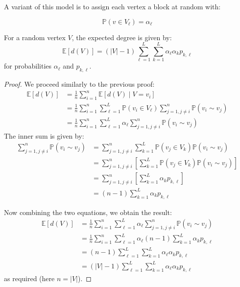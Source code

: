 \documentclass{article}
\begin{document}
A variant of this model is to assign each vertex a block at random with:    

\begin{equation*}
    \mathbb{P}(v\in V_{\ell}) = \alpha_{\ell}
\end{equation*}  

\begin{proposition}
    For a random vertex $V$, the expected degree is given by:
    \begin{equation*}
        \mathbb{E}[d(V)] = (|V|-1)\sum_{\ell=1}^{L}\sum_{k=1}^{L}\alpha_{\ell}\alpha_{k}p_{k,\ell}
    \end{equation*}
    for probabilities $\alpha_{\ell}$ and $p_{k,\ell}$.
\end{proposition}

\begin{proof}
    We proceed similarly to the previous proof:
    \begin{align*}
        \mathbb{E}[d(V)] &= \frac{1}{n} \sum_{i=1}^n \mathbb{E}[d(V)\mid V=v_i]\\
        &= \frac{1}{n} \sum_{i=1}^n \sum_{\ell=1}^L \mathbb{P}(v_i \in V_{\ell}) \sum_{j=1, j\neq i}^n \mathbb{P}(v_i \sim v_j)\\
        &= \frac{1}{n} \sum_{i=1}^n \sum_{\ell=1}^L \alpha_\ell \sum_{j=1, j\neq i}^n \mathbb{P}(v_i \sim v_j)
    \end{align*}
    The inner sum is given by:
    \begin{align*}
        \sum_{j=1, j\neq i}^n \mathbb{P}(v_i \sim v_j) &= \sum_{j=1, j\neq i}^n \sum_{k=1}^L \mathbb{P}(v_j \in V_k) \mathbb{P}(v_i \sim v_j)\\
        &= \sum_{j=1, j\neq i}^n \left[\sum_{k=1}^L \mathbb{P}(v_j \in V_k) \mathbb{P}(v_i \sim v_j)\right]\\
        &= \sum_{j=1, j\neq i}^n \left[\sum_{k=1}^L \alpha_k p_{k,\ell}\right]\\
        &= (n-1) \sum_{k=1}^L \alpha_k p_{k,\ell}
    \end{align*}

    Now combining the two equations, we obtain the result:
    \begin{align*}
        \mathbb{E}[d(V)] &=\frac{1}{n} \sum_{i=1}^n \sum_{\ell=1}^L \alpha_\ell \sum_{j=1, j\neq i}^n \mathbb{P}(v_i \sim v_j) \\
        &= \frac{1}{n} \sum_{i=1}^n \sum_{\ell=1}^L \alpha_\ell (n-1) \sum_{k=1}^L \alpha_k p_{k,\ell} \\
        &= (n-1) \sum_{\ell=1}^L \sum_{k=1}^L \alpha_\ell \alpha_k p_{k,\ell} \\
        &= (|V|-1) \sum_{\ell=1}^L \sum_{k=1}^L \alpha_\ell \alpha_k p_{k,\ell}
    \end{align*}
    as required (here $n=|V|$).
\end{proof}
\end{document}
